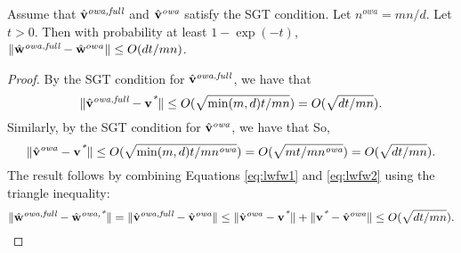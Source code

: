 \documentclass[thesis.tex]{subfiles}
\newcommand{\nowa}{n^{\textit{owa}}}
\begin{document}
\begin{lemma}
    \label{lemma:wowafullwowa}
Assume that $\hat{\mathbf{v}}^{\textit{owa,full}}$ and $\hat{\mathbf{v}}^{\textit{owa}}$ satisfy the SGT condition.
Let $\nowa=mn/d$.
Let $t>0$.
Then with probability at least $1-\exp(-t)$, ${\lVert {\hat{\mathbf w}^{\textit{owa,full}}-\hat{\mathbf w}^{owa}} \rVert}\le O(dt/mn)$.
\end{lemma}
\begin{proof}
    By the SGT condition for $\hat{\mathbf{v}}^{\textit{owa,full}}$, we have that
    \begin{equation}
        \label{eq:lwfw1}
        {\lVert {\hat{\mathbf{v}}^{\textit{owa,full}}-\mathbf{v}^{\textit{*}}} \rVert} \le O(\sqrt{\min(m,d)t/mn}) = O(\sqrt{dt/mn}).
    \end{equation}
    Similarly, by the SGT condition for $\hat{\mathbf{v}}^{\textit{owa}}$, we have that
    So,
    \begin{equation}
        \label{eq:lwfw2}
        \ltwo{\vowa-\vstar} \le O(\sqrt{\min(m,d)t/m\nowa}) = O(\sqrt{mt/m\nowa}) = O(\sqrt{dt/mn}).
    \end{equation}
    The result follows by combining Equations \ref{eq:lwfw1} and \ref{eq:lwfw2} using the triangle inequality:
    \begin{equation}
        {\lVert {\hat{\mathbf w}^{\textit{owa,full}}-\hat{\mathbf w}^{\textit{owa,*}}} \rVert} = {\lVert {\hat{\mathbf{v}}^{\textit{owa,full}}-\hat{\mathbf{v}}^{\textit{owa}}} \rVert} \le {\lVert {\hat{\mathbf{v}}^{\textit{owa}}-\mathbf{v}^{\textit{*}}} \rVert} + {\lVert {\mathbf{v}^{\textit{*}}-\hat{\mathbf{v}}^{\textit{owa}}} \rVert} 
        \le O(\sqrt{dt/mn})
        .
    \end{equation}
\end{proof}
\end{document}
